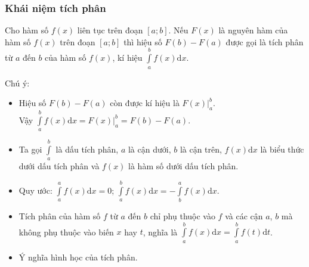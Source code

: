 \subsubsection{Khái niệm tích phân}
Cho hàm số $f(x)$ liên tục trên đoạn $\left[a;b\right]$. Nếu $F(x)$ là nguyên hàm của hàm số $f(x)$ trên đoạn $\left[a;b\right]$ thì hiệu số $F(b)-F(a)$ được gọi là tích phân từ $a$ đến $b$ của hàm số $f(x)$, kí hiệu $\displaystyle\int\limits_a^bf(x)\mathrm{d}x$.\\
\begin{note}Chú ý:
	\begin{itemize}
\item Hiệu số $F(b)-F(a)$ còn được kí hiệu là $ F(x)\big|_a^b$.\\
Vậy $\displaystyle\int\limits_a^bf(x)\mathrm{d}x= F(x)\big|_a^b=F(b)-F(a)$.
\item Ta gọi $\displaystyle\int\limits_a^b{}$ là dấu tích phân, $a$ là cận dưới, $b$ là cận trên, $f(x)\mathrm{d}x$ là biểu thức dưới dấu tích phân và $f(x)$ là hàm số dưới dấu tích phân.
\item Quy ước: $\displaystyle\int\limits_a^af(x)\mathrm{d}x=0$; $\displaystyle\int\limits_a^bf(x)\mathrm{d}x=-\displaystyle\int\limits_b^af(x)\mathrm{d}x$.
\item Tích phân của hàm số $f$ từ $a$ đến $b$ chỉ phụ thuộc vào $f$ và các cận $a$, $b$ mà không phụ thuộc vào biến $x$ hay $t$, nghĩa là $\displaystyle\int\limits_a^bf(x)\mathrm{d}x=\displaystyle\int\limits_a^bf(t)\mathrm{d}t$.
\item Ý nghĩa hình học của tích phân.\\
\end{itemize}
\end{note}
